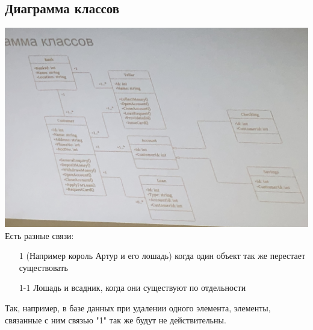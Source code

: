 \documentclass[12pt; a4paper]{book}
\begin{document}
\subsection{Диаграмма классов}
\includegraphics[angle=0, width=\textwidth]{IMG/class_diagram.jpg} \\
Есть разные связи: 
\begin{enumerate}
\item[1] (Например король Артур и его лошадь) когда один объект так же перестает существовать
\item[1-1] Лошадь и всадник, когда они существуют по отдельности
\end{enumerate}
Так, например, в базе данных при удалении одного элемента, элементы, связанные с ним связью "1" так же будут не действительны.
\end{document}
